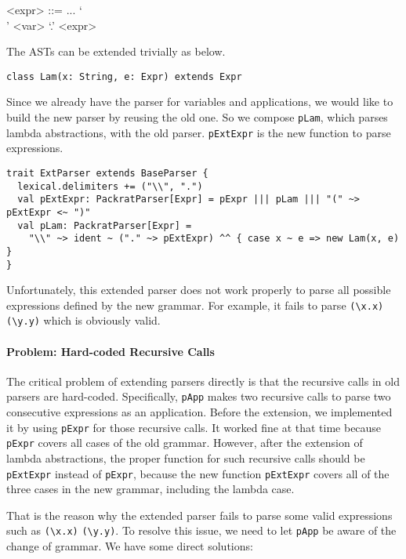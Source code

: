 \setlength{\grammarindent}{5em}
\begin{grammar}
<expr> ::= ...
    \alt `\\' <var> `.' <expr>
\end{grammar}

The ASTs can be extended trivially as below.

\begin{lstlisting}
class Lam(x: String, e: Expr) extends Expr
\end{lstlisting}

Since we already have the parser for variables and applications, we would like to build the new parser by reusing the old one. So we compose \lstinline{pLam}, which parses lambda abstractions, with the old parser. \lstinline{pExtExpr} is the new function to parse expressions.

\begin{lstlisting}
trait ExtParser extends BaseParser {
  lexical.delimiters += ("\\", ".")
  val pExtExpr: PackratParser[Expr] = pExpr ||| pLam ||| "(" ~> pExtExpr <~ ")"
  val pLam: PackratParser[Expr] =
    "\\" ~> ident ~ ("." ~> pExtExpr) ^^ { case x ~ e => new Lam(x, e) }
}
\end{lstlisting}

Unfortunately, this extended parser does not work properly to parse all possible expressions defined by the new grammar. For example, it fails to parse \lstinline{(\x.x)} \lstinline{(\y.y)} which is obviously valid.

\paragraph{Problem: Hard-coded Recursive Calls} The critical problem of extending parsers directly is that the recursive calls in old parsers are hard-coded. Specifically, \lstinline{pApp} makes two recursive calls to parse two consecutive expressions as an application. Before the extension, we implemented it by using \lstinline{pExpr} for those recursive calls. It worked fine at that time because \lstinline{pExpr} covers all cases of the old grammar. However, after the extension of lambda abstractions, the proper function for such recursive calls should be \lstinline{pExtExpr} instead of \lstinline{pExpr}, because the new function \lstinline{pExtExpr} covers all of the three cases in the new grammar, including the lambda case.

That is the reason why the extended parser fails to parse some valid expressions such as \lstinline{(\x.x)} \lstinline{(\y.y)}. To resolve this issue, we need to let \lstinline{pApp} be aware of the change of grammar. We have some direct solutions:

